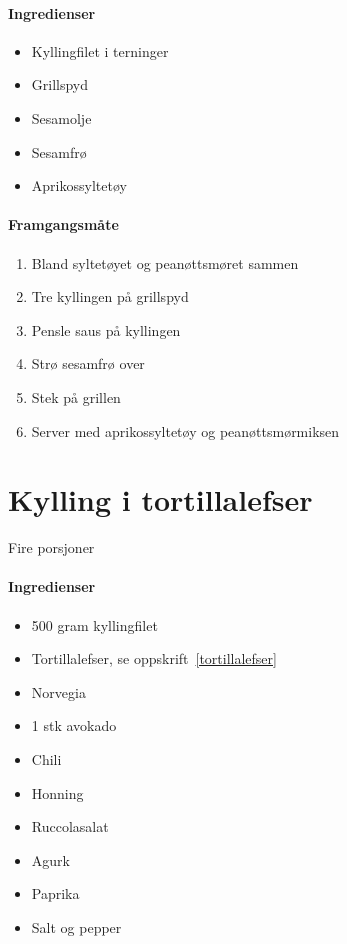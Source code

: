 \documentclass[12pt,a4paper]{book}
\begin{document}
{\paragraph{Ingredienser}
\begin{itemize}[noitemsep]
	\item Kyllingfilet i terninger
	\item Grillspyd
	\item Sesamolje
	\item Sesamfrø
	\item Aprikossyltetøy
\end{itemize}

\paragraph{Framgangsmåte}
\begin{enumerate}[noitemsep]
	\item Bland syltetøyet og peanøttsmøret sammen
	\item Tre kyllingen på grillspyd
	\item Pensle saus på kyllingen
	\item Strø sesamfrø over
	\item Stek på grillen
	\item Server med aprikossyltetøy og peanøttsmørmiksen
\end{enumerate}
\clearpage{}
\clearpage{}\section{﻿Kylling i tortillalefser}
\label{kyllingtortilla}

Fire porsjoner

\paragraph{Ingredienser}
\begin{itemize}[noitemsep]
	\item 500 gram kyllingfilet
		\item Tortillalefser, se oppskrift~\ref{tortillalefser}
		\item Norvegia
		\item 1 stk avokado
		\item Chili
		\item Honning
		\item Ruccolasalat
		\item Agurk
		\item Paprika
		\item Salt og pepper
\end{itemize}

}
\end{document}
